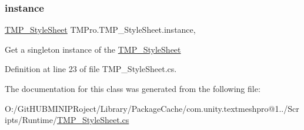 \subsubsection{\texorpdfstring{instance}{instance}}
{\footnotesize\ttfamily \mbox{\hyperlink{class_t_m_pro_1_1_t_m_p___style_sheet}{T\+M\+P\+\_\+\+Style\+Sheet}} T\+M\+Pro.\+T\+M\+P\+\_\+\+Style\+Sheet.\+instance\hspace{0.3cm}{\ttfamily [static]}, {\ttfamily [get]}}



Get a singleton instance of the \mbox{\hyperlink{class_t_m_pro_1_1_t_m_p___style_sheet}{T\+M\+P\+\_\+\+Style\+Sheet}} 



Definition at line 23 of file T\+M\+P\+\_\+\+Style\+Sheet.\+cs.



The documentation for this class was generated from the following file\+:\begin{DoxyCompactItemize}
\item 
O\+:/\+Git\+H\+U\+B\+M\+I\+N\+I\+P\+Roject/\+Library/\+Package\+Cache/com.\+unity.\+textmeshpro@1../\+Scripts/\+Runtime/\mbox{\hyperlink{_t_m_p___style_sheet_8cs}{T\+M\+P\+\_\+\+Style\+Sheet.\+cs}}\end{DoxyCompactItemize}
